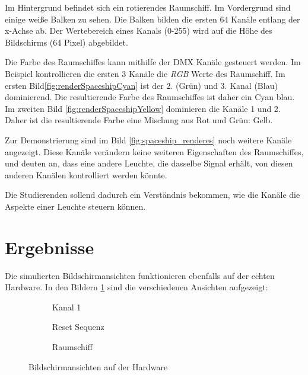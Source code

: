 Im Hintergrund befindet sich ein rotierendes Raumschiff. Im Vordergrund sind einige weiße Balken zu sehen. Die Balken bilden die ersten 64 Kanäle entlang der x-Achse ab. Der Wertebereich eines Kanals (0-255) wird auf die Höhe des Bildschirms (64 Pixel) abgebildet.

Die Farbe des Raumschiffes kann mithilfe der DMX Kanäle gesteuert werden. Im Beispiel kontrollieren die ersten 3 Kanäle die \emph{RGB} Werte des Raumschiff. Im ersten Bild\ref{fig:renderSpaceshipCyan} ist der 2. (Grün) und 3. Kanal (Blau) dominierend. Die resultierende Farbe des Raumschiffes ist daher ein Cyan blau. Im zweiten Bild \ref{fig:renderSpaceshipYellow} dominieren die Kanäle 1 und 2. Daher ist die resultierende Farbe eine Mischung aus Rot und Grün: Gelb.

Zur Demonstrierung sind im Bild \ref{fig:spaceship_renderes} noch weitere Kanäle angezeigt. Diese Kanäle verändern keine weiteren Eigenschaften des Raumschiffes, und deuten an, dass eine andere Leuchte, die dasselbe Signal erhält, von diesen anderen Kanälen kontrolliert werden könnte.

Die Studierenden sollend dadurch ein Verständnis bekommen, wie die Kanäle die Aspekte einer Leuchte steuern können.

\section{Ergebnisse}

Die simulierten Bildschirmansichten funktionieren ebenfalls auf der echten Hardware. In den Bildern \ref{fig:dmxScreensOnHardware} sind die verschiedenen Ansichten aufgezeigt:

\begin{figure}[H]
	\centering
	\begin{subfigure}{.32\textwidth}
		\centering
		\caption{Kanal 1}
	\end{subfigure}
	\hfill
	\begin{subfigure}{.32\textwidth}
		\centering
		\caption{Reset Sequenz}
	\end{subfigure}
	\hfill
	\begin{subfigure}{.32\textwidth}
		\centering
		\caption{Raumschiff}
	\end{subfigure}
	\caption{Bildschirmansichten auf der Hardware}
	\label{fig:dmxScreensOnHardware}
\end{figure}


